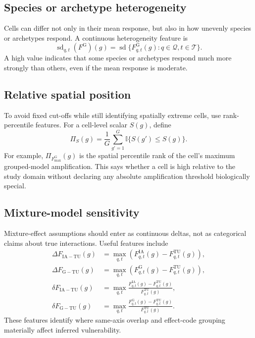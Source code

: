 \documentclass[11pt]{article}
\begin{document}
\subsection{Species or archetype heterogeneity}
Cells can differ not only in their mean response, but also in how unevenly species or archetypes respond.
A continuous heterogeneity feature is
\begin{equation}
\operatorname{sd}_{q,t}\left(F^{\mathrm{G}}\right)(g)
=\operatorname{sd}\{F_{q,t}^{\mathrm{G}}(g):q\in\mathcal{Q},t\in\mathcal{T}\}.
\end{equation}
A high value indicates that some species or archetypes respond much more strongly than others, even if the
mean response is moderate.

\subsection{Relative spatial position}
To avoid fixed cut-offs while still identifying spatially extreme cells, use rank-percentile features. For a
cell-level scalar $S(g)$, define
\begin{equation}
\Pi_S(g)=\frac{1}{G}\sum_{g'=1}^{G}\mathbb{I}\{S(g')\le S(g)\}.
\end{equation}
For example, $\Pi_{F_{\max}^{\mathrm{G}}}(g)$ is the spatial percentile rank of the cell's maximum grouped-model
amplification. This says whether a cell is high relative to the study domain without declaring any absolute
amplification threshold biologically special.

\subsection{Mixture-model sensitivity}
Mixture-effect assumptions should enter as continuous deltas, not as categorical claims about true interactions.
Useful features include
\begin{align}
\Delta F_{\mathrm{IA}-\mathrm{TU}}(g)
&=\max_{q,t}\left(F_{q,t}^{\mathrm{IA}}(g)-F_{q,t}^{\mathrm{TU}}(g)\right),\\
\Delta F_{\mathrm{G}-\mathrm{TU}}(g)
&=\max_{q,t}\left(F_{q,t}^{\mathrm{G}}(g)-F_{q,t}^{\mathrm{TU}}(g)\right),\\
\delta F_{\mathrm{IA}-\mathrm{TU}}(g)
&=\max_{q,t}\frac{F_{q,t}^{\mathrm{IA}}(g)-F_{q,t}^{\mathrm{TU}}(g)}{F_{q,t}^{\mathrm{TU}}(g)},\\
\delta F_{\mathrm{G}-\mathrm{TU}}(g)
&=\max_{q,t}\frac{F_{q,t}^{\mathrm{G}}(g)-F_{q,t}^{\mathrm{TU}}(g)}{F_{q,t}^{\mathrm{TU}}(g)}.
\end{align}
These features identify where same-axis overlap and effect-code grouping materially affect inferred vulnerability.
\end{document}
